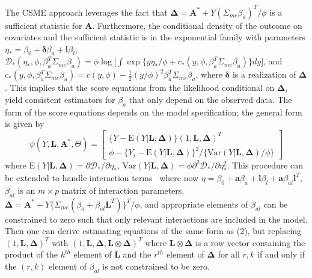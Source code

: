 \documentclass[useAMS,usenatbib,referee]{biom}
\begin{document}
The CSME approach leverages the fact that $\bm{\Delta} = \bm{A}^{*} + Y(\Sigma_{me}\beta_{a})^{T}/\phi$ is a sufficient statistic for $\bm{A}$. Furthermore, the conditional density of the outcome on covariates and the sufficient statistic is in the exponential family with parameters $\eta_{*} = \beta_{0} + \bm{\delta}\beta_{a} + \bm{l}\beta_{l}$, $\mathcal{D}_{*}(\eta_{*}, \phi, \beta_{a}^{T}\Sigma_{me}\beta_{a}) = \phi \log \bigg[ \int \exp \{ y\eta_{*}/\phi + c_{*}(y, \phi,  \beta_{a}^{T}\Sigma_{me}\beta_{a}) \} dy \bigg]$, and $c_{*}(y, \phi, \beta_{a}^{T}\Sigma_{me}\beta_{a}) = c(y, \phi) - \frac{1}{2}(y/\phi)^{2}\beta_{a}^{T}\Sigma_{me}\beta_{a}$, where $\bm{\delta}$ is a realization of $\bm{\Delta}$. This implies that the score equations from the likelihood conditional on $\bm{\Delta}_{i}$ yield consistent estimators for $\beta_{a}$ that only depend on the observed data. The form of the score equations depends on the model specification; the general form is given by
\begin{equation}
    \psi(Y, \bm{L}, \bm{A}^{*}, \Theta) =
    \begin{bmatrix}
       \{ Y - \text{E}(Y | \bm{L}, \bm{\Delta}) \} (1, \bm{L}, \bm{\Delta})^{T} \\
        \phi - \{ Y_{i} - \text{E}(Y | \bm{L}, \bm{\Delta}) \}^{2} / \{ \text{Var}(Y | \bm{L}, \bm{\Delta}) / \phi \}
    \end{bmatrix}
\end{equation}
where $\text{E}(Y | \bm{L}, \bm{\Delta}) = \partial \mathcal{D}_{*} / \partial \eta_{*}$, $\text{Var}(Y | \bm{L}, \bm{\Delta}) = \phi \partial^{2} \mathcal{D}_{*} / \partial \eta^{2}_{*}$. This procedure can be extended to handle interaction terms~\citep{dagalp2001} where now $\eta = \beta_{0} + \bm{a}\beta_{a} + \bm{l}\beta_{l} + \bm{a}\beta_{al}\bm{l}^{T}$, $\beta_{al}$ is an $m \times p$ matrix of interaction parameters, $\bm{\Delta} = \bm{A}^{*} + Y\{ \Sigma_{me}(\beta_{a} + \beta_{al}\bm{L}^{T}) \}^{T}/\phi$, and appropriate elements of $\beta_{al}$ can be constrained to zero such that only relevant interactions are included in the model. Then one can derive estimating equations of the same form as (2), but replacing $(1, \bm{L}, \bm{\Delta})^{T}$ with $(1, \bm{L}, \bm{\Delta}, \bm{L} \otimes \bm{\Delta})^{T}$ where $\bm{L} \otimes \bm{\Delta}$ is a row vector containing the product of the $k^{th}$ element of $\bm{L}$ and the $r^{th}$ element of $\bm{\Delta}$ for all $r, k$ if and only if the $(r, k)$ element of $\beta_{al}$ is not constrained to be zero.
\end{document}
